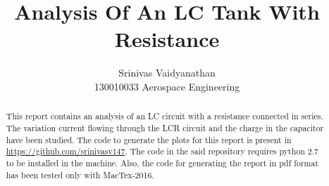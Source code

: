 \documentclass[12pt,a4paper]{report}
\begin{document}

\hypersetup{pageanchor=false}
\title{Analysis Of An LC Tank With Resistance}
\author{Srinivas Vaidyanathan \\ 130010033 Aerospace Engineering}
\maketitle
\hypersetup{pageanchor=true}
\begin{abstract}
  This report contains an analysis of an LC circuit with a resistance connected in series.
  The variation current flowing through the LCR circuit and the charge in the capacitor have been studied.
  The code to generate the plots for this report is present in \textcolor{blue}{\url{https://github.com/srinivasv147}}.
  The code in the said repository requires python 2.7 to be installed in the
  machine. Also, the code for generating the report in pdf format has been tested only with MacTex-2016.
\end{abstract}
\hypersetup{pageanchor=false}
\end{document}
